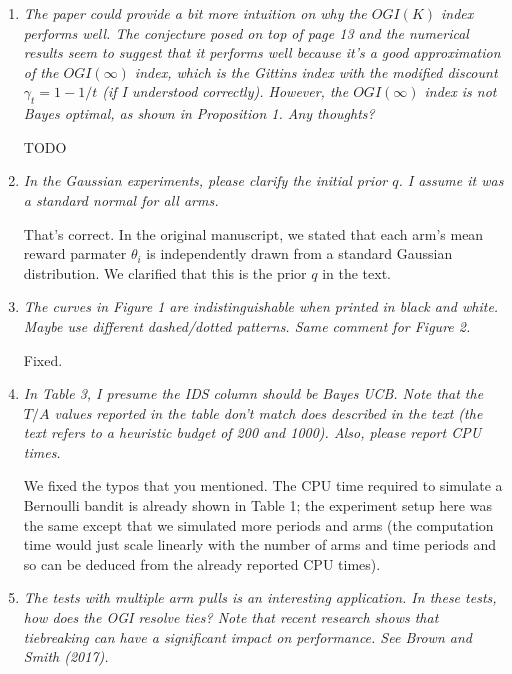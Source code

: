 \documentclass[11pt]{article}
\newcommand{\1}{\ensuremath{\mathbf{1}}} %
\theoremstyle{thm-sf}
\begin{document}
	\begin{enumerate}
		\item  {\it The paper could provide a bit more intuition on why the $OGI(K)$ index performs well. The conjecture posed on top of page 13 and the numerical results seem to suggest that it performs well because it's a good approximation of the $OGI(\infty)$ index, which is the Gittins index with the modified discount $\gamma_t = 1 - 1/t$ (if I understood correctly). However, the $OGI(\infty)$ index is not Bayes optimal, as shown in Proposition 1. Any thoughts?}
		
		TODO
		
		\item {\it In the Gaussian experiments, please clarify the initial prior $q$. I assume it was a standard normal for all arms.}
		
		That's correct. In the original manuscript, we stated that each arm's mean reward parmater $\theta_i$ is independently drawn from a standard Gaussian distribution. We clarified that this is the prior $q$ in the text.
		\item {\it The curves in Figure 1 are indistinguishable when printed in black and white. Maybe use different dashed/dotted patterns. Same comment for Figure 2.}
		
		Fixed.
		
		\item {\it In Table 3, I presume the IDS column should be Bayes UCB. Note that the $T/A$ values reported in the table don't match does described in the text (the text refers to a heuristic budget of 200 and 1000). Also, please report CPU times.}
		
		We fixed the typos that you mentioned. The CPU time required to simulate a Bernoulli bandit is already shown in Table 1; the experiment setup here was the same except that we simulated more periods and arms (the computation time would just scale linearly with the number of arms and time periods and so can be deduced from the already reported CPU times).
		\item {\it The tests with multiple arm pulls is an interesting application. In these tests, how does the OGI resolve ties? Note that recent research shows that tiebreaking can have a significant impact on performance. See Brown and Smith (2017).}
		

\end{enumerate}
\end{document}
